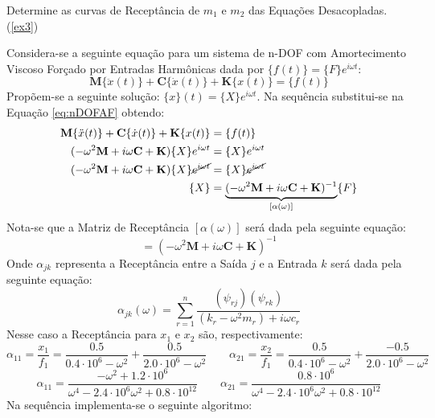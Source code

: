 \documentclass{article}
\begin{document}
\newpage\begin{exercise}\label{ex7}
    Determine as curvas de Receptância de $m_1$ e $m_2$ das Equações Desacopladas. (\ref{ex3})
\end{exercise}
\begin{resolution}
    Considera-se a seguinte equação para um sistema de n-DOF com Amortecimento Viscoso Forçado por Entradas Harmônicas dada por $\{f(t)\} = \{F\} e^{i\omega t}$:
    \begin{equation}
        \mathbf{M}\{\ddot{x}(t)\} + \mathbf{C}\{\dot{x}(t)\} + \mathbf{K}\{x(t)\} = \{f(t)\}
    \end{equation}
    \noindent Propõem-se a seguinte solução: $\{x\}(t) = \{X\} e^{i\omega t}$. Na sequência substitui-se na Equação \ref{eq:nDOFAF} obtendo:
    \begin{align*}
        \mathbf{M}\{\ddot{x}(t)\} + \mathbf{C}\{\dot{x}(t)\} + \mathbf{K}\{x(t)\} &= \{f(t)\}\\
        (-\omega^2\mathbf{M} + i\omega\mathbf{C} + \mathbf{K}) \{X\} e^{i\omega t} &= \{X\}e^{i\omega t}\\
        (-\omega^2\mathbf{M} + i\omega\mathbf{C} + \mathbf{K}) \{X\} \cancel{e^{i\omega t}} &= \{X\}\cancel{e^{i\omega t}}\\
        \{X\} &= \underbrace{(-\omega^2\mathbf{M} + i\omega\mathbf{C} + \mathbf{K})^{-1}}_{[\alpha(\omega)]} \{F\}
    \end{align*}
    Nota-se que a Matriz de Receptância $[\alpha(\omega)]$ será dada pela seguinte equação:
    \begin{equation}
        [\alpha(\omega)] = (-\omega^2\mathbf{M} + i\omega\mathbf{C} + \mathbf{K})^{-1}
    \end{equation}
    Onde $\alpha_{jk}$ representa a Receptância entre a Saída $j$ e a Entrada $k$ será dada pela seguinte equação:
    \begin{equation}
        \alpha_{jk} (\omega) = 
        \sum_{r=1}^{n} \frac{(\psi_{rj})(\psi_{rk})}{(k_r -\omega^2 m_r) + i\omega c_r}
    \end{equation}
    Nesse caso a Receptância para $x_1$ e $x_2$ são, respectivamente:
    \begin{equation*}
        \alpha_{11} = \frac{x_1}{f_1} = \frac{0.5}{0.4\cdot 10^6 -\omega^2} + \frac{0.5}{2.0\cdot 10^6 -\omega^2}
        \qquad
        \alpha_{21} = \frac{x_2}{f_1} = \frac{0.5}{0.4\cdot 10^6 -\omega^2} + \frac{-0.5}{2.0\cdot 10^6 -\omega^2}
    \end{equation*}
    \begin{equation*}
        \boxed{\alpha_{11} = \frac{-\omega^2 + 1.2\cdot 10^6}{\omega^4 - 2.4\cdot 10^6 \omega^2 + 0.8\cdot 10^{12}}}
        \qquad
        \boxed{\alpha_{21} = \frac{0.8\cdot 10^6}{\omega^4 - 2.4\cdot 10^6 \omega^2 + 0.8\cdot 10^{12}}}
    \end{equation*}
    Na sequência implementa-se o seguinte algoritmo:
    \begin{scriptsize}
        \myMatlab
    \end{scriptsize}
\end{resolution}
\end{document}
